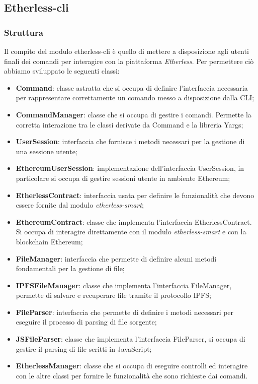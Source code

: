 \subsection{Etherless-cli}
\subsubsection{Struttura}
Il compito del modulo etherless-cli è quello di mettere a disposizione agli utenti finali dei comandi per interagire con la piattaforma \textit{Etherless}. Per permettere ciò abbiamo sviluppato le seguenti classi:
\begin{itemize}
	\item \textbf{Command}: classe astratta che si occupa di definire l'interfaccia necessaria per rappresentare correttamente un comando messo a disposizione dalla CLI;
	\item \textbf{CommandManager}: classe che si occupa di gestire i comandi. Permette la corretta interazione tra le classi derivate da Command e la libreria Yargs;
	\item \textbf{UserSession}: interfaccia che fornisce i metodi necessari per la gestione di una sessione utente;
	\item \textbf{EthereumUserSession}: implementazione dell'interfaccia UserSession, in particolare si occupa di gestire sessioni utente in ambiente Ethereum;
	\item \textbf{EtherlessContract}: interfaccia usata per definire le funzionalità che devono essere fornite dal modulo \textit{etherless-smart};
	\item \textbf{EthereumContract}: classe che implementa l'interfaccia EtherlessContract. Si occupa di interagire direttamente con il modulo \textit{etherless-smart} e con la blockchain Ethereum;
	\item \textbf{FileManager}: interfaccia che permette di definire alcuni metodi fondamentali per la gestione di file;
	\item \textbf{IPFSFileManager}: classe che implementa l'interfaccia FileManager, permette di salvare e recuperare file tramite il protocollo IPFS;
	\item \textbf{FileParser}: interfaccia che permette di definire i metodi necessari per eseguire il processo di parsing di file sorgente;
	\item \textbf{JSFileParser}: classe che implementa l'interfaccia FileParser, si occupa di gestire il parsing di file scritti in JavaScript;
	\item \textbf{EtherlessManager}: classe che si occupa di eseguire controlli ed interagire con le altre classi per fornire le funzionalità che sono richieste dai comandi.
\end{itemize}

